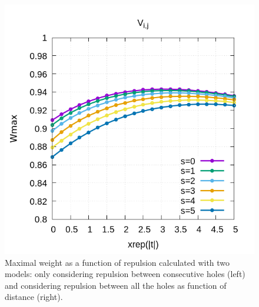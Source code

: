 \documentclass[ openright,titlepage,numbers=noenddot,headinclude,twoside,%
                footinclude=true,cleardoublepage=empty,abstractoff,%
                BCOR=5mm,paper=a4,fontsize=11pt,%
                ngerman,american,%
]{scrreprt}
\begin{document}
\begin{figure}[h!]
\begin{minipage}{0.4\textwidth}
    \includegraphics[scale=0.4]{Wmax_vs_xrep0vn.png}
    \end{minipage}
    \caption{\label{fig:} Maximal weight as a function of repulsion calculated with two models: only considering repulsion between consecutive holes (left) and considering repulsion between all the holes as function of distance (right). }
\end{figure}
\end{document}
